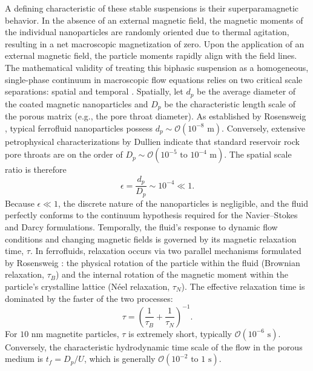A defining characteristic of these stable suspensions is their superparamagnetic behavior.
In the absence of an external magnetic field, the magnetic moments of the individual nanoparticles are randomly oriented due to thermal agitation, resulting in a net macroscopic magnetization of zero.
Upon the application of an external magnetic field, the particle moments rapidly align with the field lines.
The mathematical validity of treating this biphasic suspension as a homogeneous, single-phase continuum in macroscopic flow equations relies on two critical scale separations: spatial and temporal \cite{rosensweig1985ferrohydrodynamics}.
Spatially, let $d_p$ be the average diameter of the coated magnetic nanoparticles and $D_p$ be the characteristic length scale of the porous matrix (e.g., the pore throat diameter).
As established by Rosensweig \cite{rosensweig1985ferrohydrodynamics}, typical ferrofluid nanoparticles possess $d_p \sim \mathcal{O}(10^{-8} \text{ m})$.
Conversely, extensive petrophysical characterizations by Dullien \cite{dullien1992porous} indicate that standard reservoir rock pore throats are on the order of $D_p \sim \mathcal{O}(10^{-5} \text{ to } 10^{-4} \text{ m})$.
The spatial scale ratio is therefore
\begin{equation}
    \epsilon = \frac{d_p}{D_p} \sim 10^{-4} \ll 1.
\end{equation}
Because $\epsilon \ll 1$, the discrete nature of the nanoparticles is negligible, and the fluid perfectly conforms to the continuum hypothesis required for the Navier--Stokes and Darcy formulations.
Temporally, the fluid's response to dynamic flow conditions and changing magnetic fields is governed by its magnetic relaxation time, $\tau$.
In ferrofluids, relaxation occurs via two parallel mechanisms formulated by Rosensweig \cite{rosensweig1985ferrohydrodynamics}: the physical rotation of the particle within the fluid (Brownian relaxation, $\tau_B$) and the internal rotation of the magnetic moment within the particle's crystalline lattice (Néel relaxation, $\tau_N$).
The effective relaxation time is dominated by the faster of the two processes:
\begin{equation}
    \tau = \left( \frac{1}{\tau_B} + \frac{1}{\tau_N} \right)^{-1}.
\end{equation}
For $10$ nm magnetite particles, $\tau$ is extremely short, typically $\mathcal{O}(10^{-6} \text{ s})$.
Conversely, the characteristic hydrodynamic time scale of the flow in the porous medium is $t_f = D_p / U$, which is generally $\mathcal{O}(10^{-2} \text{ to } 1 \text{ s})$.

